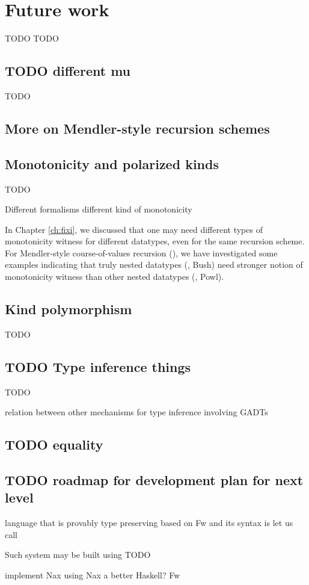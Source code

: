 \chapter{Future work}\label{ch:futwork} TODO
TODO


\section{TODO different mu}\label{sec:futwork:mu}
TODO

\section{More on Mendler-style recursion schemes}

\section{Monotonicity and polarized kinds}
TODO

Different formalisms different kind of monotonicity

In Chapter \ref{ch:fixi}, we discussed that one may need
different types of monotonicity witness for different datatypes,
even for the same recursion scheme.
For Mendler-style course-of-values recursion (\McvPr),
we have investigated some examples indicating that
truly nested datatypes (\eg, Bush) need stronger notion of
monotonicity witness than other nested datatypes (\eg, Powl).


\section{Kind polymorphism}\label{sec:futwork:kindpoly}
TODO

\section{TODO Type inference things}
TODO

relation between other mechanisms for type inference involving GADTs

\section{TODO equality}

\section{TODO roadmap for development plan for next level}

language that is provably type preserving
based on Fw and its syntax is 
let us call

Such system may be built using TODO


implement Nax using Nax
a better Haskell?
Fw
